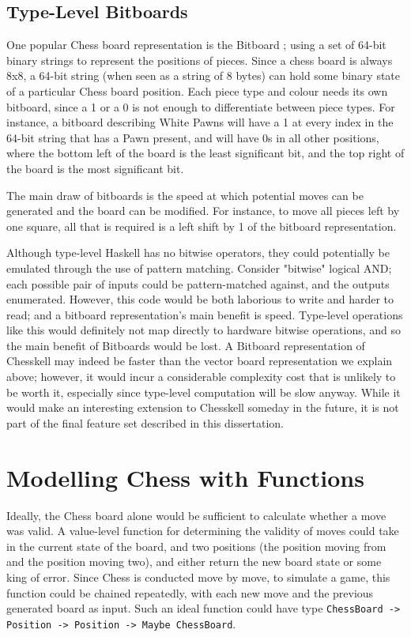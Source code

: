 \documentclass[12pt, a4paper, bibliography=totocnumbered]{scrreprt}
\newcommand{\inline}[1]{\lstinline[basicstyle=\ttfamily\footnotesize]{#1}}
\begin{document}
\subsection{Type-Level Bitboards}

One popular Chess board representation is the Bitboard \cite{bitboard}; using a set of 64-bit binary strings to represent the positions of pieces. Since a chess board is always 8x8, a 64-bit string (when seen as a string of 8 bytes) can hold some binary state of a particular Chess board position. Each piece type and colour needs its own bitboard, since a 1 or a 0 is not enough to differentiate between piece types. For instance, a bitboard describing White Pawns will have a 1 at every index in the 64-bit string that has a Pawn present, and will have 0s in all other positions, where the bottom left of the board is the least significant bit, and the top right of the board is the most significant bit.

The main draw of bitboards is the speed at which potential moves can be generated and the board can be modified. For instance, to move all pieces left by one square, all that is required is a left shift by 1 of the bitboard representation.

Although type-level Haskell has no bitwise operators, they could potentially be emulated through the use of pattern matching. Consider "bitwise" logical AND; each possible pair of inputs could be pattern-matched against, and the outputs enumerated. However, this code would be both laborious to write and harder to read; and a bitboard representation's main benefit is speed. Type-level operations like this would definitely not map directly to hardware bitwise operations, and so the main benefit of Bitboards would be lost. A Bitboard representation of Chesskell may indeed be faster than the vector board representation we explain above; however, it would incur a considerable complexity cost that is unlikely to be worth it, especially since type-level computation will be slow anyway. While it would make an interesting extension to Chesskell someday in the future, it is not part of the final feature set described in this dissertation.

\section{Modelling Chess with Functions}

Ideally, the Chess board alone would be sufficient to calculate whether a move was valid. A value-level function for determining the validity of moves could take in the current state of the board, and two positions (the position moving from and the position moving two), and either return the new board state or some king of error. Since Chess is conducted move by move, to simulate a game, this function could be chained repeatedly, with each new move and the previous generated board as input. Such an ideal function could have type \inline{ChessBoard -> Position -> Position -> Maybe ChessBoard}.
\end{document}
